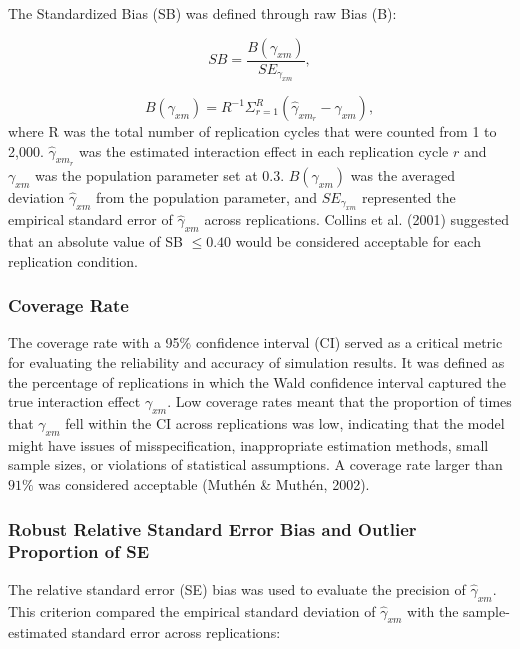 \documentclass[
  man]{apa6}
\begin{document}
The Standardized Bias (SB) was defined through raw Bias (B):

\begin{equation}
SB = \frac{B(\gamma_{xm})}{SE_{\gamma_{xm}}},
\end{equation}

\begin{equation}
B(\gamma_{xm}) = R^{-1}\Sigma^{R}_{r = 1}(\hat{\gamma}_{xm_{r}} - \gamma_{xm}),
\end{equation}
where R was the total number of replication cycles that were counted from 1 to 2,000. \(\hat{\gamma}_{xm_{r}}\) was the estimated interaction effect in each replication cycle \(r\) and \(\gamma_{xm}\) was the population parameter set at 0.3. \(B(\gamma_{xm})\) was the averaged deviation \(\hat{\gamma}_{xm}\) from the population parameter, and \(SE_{\gamma_{xm}}\) represented the empirical standard error of \(\hat{\gamma}_{xm}\) across replications. Collins et al. (2001) suggested that an absolute value of SB \(\le 0.40\) would be considered acceptable for each replication condition.

\subsubsection{Coverage Rate}\label{coverage-rate}

The coverage rate with a 95\(\%\) confidence interval (CI) served as a critical metric for evaluating the reliability and accuracy of simulation results. It was defined as the percentage of replications in which the Wald confidence interval captured the true interaction effect \(\gamma_{xm}\). Low coverage rates meant that the proportion of times that \(\gamma_{xm}\) fell within the CI across replications was low, indicating that the model might have issues of misspecification, inappropriate estimation methods, small sample sizes, or violations of statistical assumptions. A coverage rate larger than \(91\%\) was considered acceptable (Muthén \& Muthén, 2002).

\subsubsection{Robust Relative Standard Error Bias and Outlier Proportion of SE}\label{robust-relative-standard-error-bias-and-outlier-proportion-of-se}

The relative standard error (SE) bias was used to evaluate the precision of \(\hat{\gamma}_{xm}\). This criterion compared the empirical standard deviation of \(\hat{\gamma}_{xm}\) with the sample-estimated standard error across replications:
\end{document}
